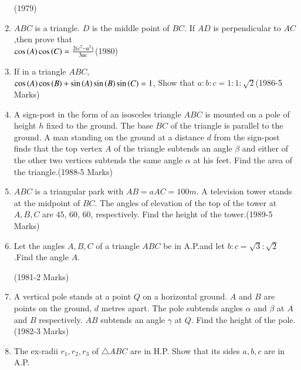 \documentclass[journal,12pt,twocolumn]{IEEEtran}
\theoremstyle{remark}
\begin{document}
\begin{enumerate}
    \hfill(1979)
    \item $ABC$ is a triangle. $D$ is the middle point of $BC$. If $AD$ is perpendicular to $AC$,then prove that \\
    $\cos\left(A\right) \cos\left(C\right) = \frac{2(c^2 - a^2)}{3ac}$\hfill(1980)
    \item If in a triangle $ABC$,\\ $\cos\left(A\right) \cos\left(B\right)+\sin\left(A\right) \sin\left(B\right) \sin\left(C\right)=1$, Show that $a:b:c=1:1:\sqrt{2}$\hfill(1986-5 Marks)
    \item A sign-post in the form of an isosceles triangle $ABC$ is mounted on a pole of height $h$ fixed to the ground. The base $BC$ of the triangle is parallel to the ground. A man standing on the ground at a distance $d$ from the sign-post finds that the top vertex $A$ of the triangle subtends an angle $\beta$ and either of the other two vertices subtends the same angle $\alpha$ at his feet. Find the area of the triangle.\hfill(1988-5 Marks)
    \item $ABC$ is a triangular park with $AB=aAC=100m$. A television tower stands at the midpoint of $BC$. The angles of elevation of the top of the tower at $A,B,C$ are $45$\textdegree, $60$\textdegree, $60$\textdegree, respectively. Find the height of the tower.\hfill(1989-5 Marks)
    \item Let the angles $A,B,C$ of a triangle $ABC$ be in A.P.and let $b:c=\sqrt{3}:\sqrt{2}$.Find the angle $A$.
    
    \hfill(1981-2 Marks)
    \item A vertical pole stands at a point $Q$ on a horizontal ground. $A$ and $B$ are points on the ground, $d$ metres apart. The pole subtends angles $\alpha$ and $\beta$ at $A$ and $B$ respectively. $AB$ subtends an angle $\gamma$ at $Q$. Find the height of the pole.\hfill(1982-3 Marks)
    \item The ex-radii $r_1,r_2,r_3$ of $\triangle ABC$ are in H.P. Show that its sides $a,b,c$ are in A.P.


\end{enumerate}
\end{document}
